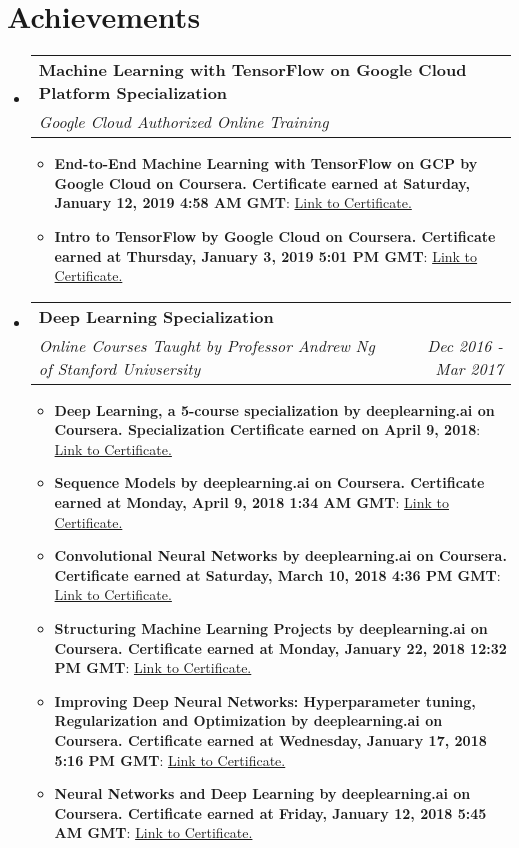 \documentclass[letterpaper,11pt]{article}
\makeatletter
\newcommand{\resumeItem}[2]{
  \item\small{
    \textbf{#1}{: #2 \vspace{-2pt}}
  }
}
\newcommand{\resumeSubheading}[4]{
  \vspace{-1pt}\item
    \begin{tabular*}{0.97\textwidth}{l@{\extracolsep{\fill}}r}
      \textbf{#1} & #2 \\
      \textit{\small#3} & \textit{\small #4} \\
    \end{tabular*}\vspace{-5pt}
}
\newcommand{\resumeSubHeadingListStart}{\begin{itemize}[leftmargin=*]}
\newcommand{\resumeSubHeadingListEnd}{\end{itemize}}
\newcommand{\resumeItemListStart}{\begin{itemize}}
\newcommand{\resumeItemListEnd}{\end{itemize}\vspace{-5pt}}
\makeatother
\begin{document}
\section{Achievements}
  \resumeSubHeadingListStart

      \resumeSubheading
      {Machine Learning with TensorFlow on Google Cloud Platform Specialization}{}
      {Google Cloud Authorized Online Training}{}
      \resumeItemListStart
      	\resumeItem{End-to-End Machine Learning with TensorFlow on GCP by Google Cloud on Coursera. Certificate earned at Saturday, January 12, 2019 4:58 AM GMT}{\href{https://www.coursera.org/account/accomplishments/certificate/MHSW45J3MCHE}{Link to Certificate.}}
		
      	\resumeItem{Intro to TensorFlow by Google Cloud on Coursera. Certificate earned at Thursday, January 3, 2019 5:01 PM GMT}{\href{https://www.coursera.org/account/accomplishments/certificate/3ATYUGGV27PN}{Link to Certificate.}}
      \resumeItemListEnd    

  \resumeSubheading
      {Deep Learning Specialization}{}
      {Online Courses Taught by Professor Andrew Ng of Stanford Univsersity}{Dec 2016 - Mar 2017}
      
      \resumeItemListStart

      	\resumeItem{Deep Learning, a 5-course specialization by deeplearning.ai on Coursera. Specialization Certificate earned on April 9, 2018}{\href{https://www.coursera.org/account/accomplishments/specialization/XN5D4YXVX6BY}{Link to Certificate.}}
      	
      	\resumeItem{Sequence Models by deeplearning.ai on Coursera. Certificate earned at Monday, April 9, 2018 1:34 AM GMT}{\href{https://www.coursera.org/account/accomplishments/certificate/37F5JB396YKH}{Link to Certificate.}}

		\resumeItem{Convolutional Neural Networks by deeplearning.ai on Coursera. Certificate earned at Saturday, March 10, 2018 4:36 PM GMT}{\href{https://www.coursera.org/account/accomplishments/certificate/5E8EY9ABTE97}{Link to Certificate.}}
		
		\resumeItem{Structuring Machine Learning Projects by deeplearning.ai on Coursera. Certificate earned at Monday, January 22, 2018 12:32 PM GMT}{\href{https://www.coursera.org/account/accomplishments/certificate/N92PV492N44B}{Link to Certificate.}}
		
		\resumeItem{Improving Deep Neural Networks: Hyperparameter tuning, Regularization and Optimization by deeplearning.ai on Coursera. Certificate earned at Wednesday, January 17, 2018 5:16 PM GMT}{\href{https://www.coursera.org/account/accomplishments/certificate/JFWNYFRNUQZ7}{Link to Certificate.}}
		
		\resumeItem{Neural Networks and Deep Learning by deeplearning.ai on Coursera. Certificate earned at Friday, January 12, 2018 5:45 AM GMT}{\href{https://www.coursera.org/account/accomplishments/certificate/FY5MY44T8GE3}{Link to Certificate.}}
				
      \resumeItemListEnd         
          
 \resumeSubHeadingListEnd

\end{document}
